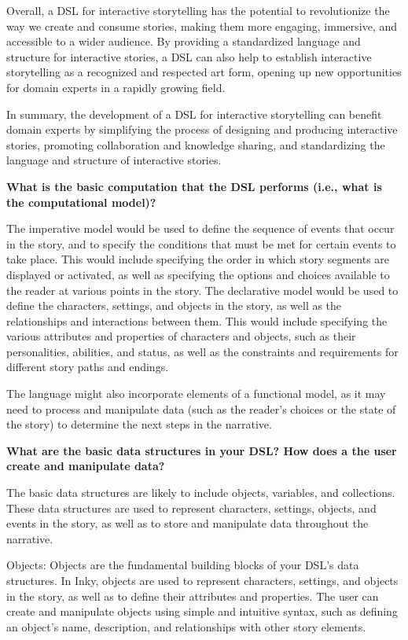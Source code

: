 Overall, a DSL for interactive storytelling has the potential to revolutionize the way we create and consume stories, making them more engaging, immersive, and accessible to a wider audience. By providing a standardized language and structure for interactive stories, a DSL can also help to establish interactive storytelling as a recognized and respected art form, opening up new opportunities for domain experts in a rapidly growing field.

In summary, the development of a DSL for interactive storytelling can benefit domain experts by simplifying the process of designing and producing interactive stories, promoting collaboration and knowledge sharing, and standardizing the language and structure of interactive stories.

\textbf{What is the basic computation that the DSL performs (i.e., what is the computational model)?}

The imperative model would be used to define the sequence of events that occur in the story, and to specify the conditions that must be met for certain events to take place. This would include specifying the order in which story segments are displayed or activated, as well as specifying the options and choices available to the reader at various points in the story.
The declarative model would be used to define the characters, settings, and objects in the story, as well as the relationships and interactions between them. This would include specifying the various attributes and properties of characters and objects, such as their personalities, abilities, and status, as well as the constraints and requirements for different story paths and endings.

The language might also incorporate elements of a functional model, as it may need to process and manipulate data (such as the reader's choices or the state of the story) to determine the next steps in the narrative.

\textbf {What are the basic data structures in your DSL? How does a the user create and manipulate data?}

The basic data structures are likely to include objects, variables, and collections. These data structures are used to represent characters, settings, objects, and events in the story, as well as to store and manipulate data throughout the narrative.

Objects: Objects are the fundamental building blocks of your DSL's data structures. In Inky, objects are used to represent characters, settings, and objects in the story, as well as to define their attributes and properties. The user can create and manipulate objects using simple and intuitive syntax, such as defining an object's name, description, and relationships with other story elements.

